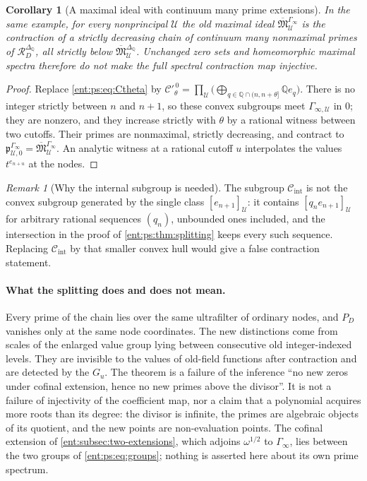 \documentclass[11pt]{article}
\theoremstyle{plain}
\theoremstyle{plain}
\theoremstyle{plain}
\newtheorem{corollary}[corollary]{Corollary}
\theoremstyle{definition}
\theoremstyle{definition}
\theoremstyle{definition}
\theoremstyle{definition}
\theoremstyle{remark}
\newtheorem{remark}[remark]{Remark}
\newcommand{\Q}{\mathbb Q}\newcommand{\Z}{\mathbb Z}\newcommand{\N}{\mathbb N}
\newcommand{\RD}{\mathcal R_D}\newcommand{\Ucal}{\mathcal U}
\begin{document}
\begin{corollary}[A maximal ideal with continuum many prime extensions]
\label{ent:ps:cor:maximal-splitting}
In the same example, for every nonprincipal $\Ucal$ the old maximal ideal
$\overline{\mathfrak M}{}^{\Gamma_\infty}_\Ucal$ is the contraction of a
strictly decreasing chain of continuum many nonmaximal primes of
$\RD^{\Delta_\Q}$, all strictly below
$\overline{\mathfrak M}{}^{\Delta_\Q}_\Ucal$. Unchanged zero sets and
homeomorphic maximal spectra therefore do not make the full spectral
contraction map injective.
\end{corollary}
\begin{proof}
Replace \eqref{ent:ps:eq:Ctheta} by
$\mathcal C'^{\,0}_\theta=\prod_\Ucal\bigl(\bigoplus_{q\in\Q\cap(n,n+\theta]}
\Q e_q\bigr)$. There is no integer strictly between $n$ and $n+1$, so these
convex subgroups meet $\Gamma_{\infty,\Ucal}$ in $0$; they are nonzero, and
they increase strictly with $\theta$ by a rational witness between two
cutoffs. Their primes are nonmaximal, strictly decreasing, and contract to
$\mathfrak p^{\Gamma_\infty}_{\Ucal,0}=\overline{\mathfrak
M}{}^{\Gamma_\infty}_\Ucal$. An analytic witness at a rational cutoff $u$
interpolates the values $t^{e_{n+u}}$ at the nodes.
\end{proof}

\begin{remark}[Why the internal subgroup is needed]
The subgroup $\mathcal C_{\mathrm{int}}$ is not the convex subgroup generated
by the single class $[e_{n+1}]_\Ucal$: it contains $[q_ne_{n+1}]_\Ucal$ for
arbitrary rational sequences $(q_n)$, unbounded ones included, and the
intersection in the proof of \cref{ent:ps:thm:splitting} keeps every such
sequence. Replacing $\mathcal C_{\mathrm{int}}$ by that smaller convex hull
would give a false contraction statement.
\end{remark}

\paragraph{What the splitting does and does not mean.}
Every prime of the chain lies over the same ultrafilter of ordinary nodes,
and $P_D$ vanishes only at the same node coordinates. The new distinctions
come from scales of the enlarged value group lying between consecutive old
integer-indexed levels. They are invisible to the values of old-field
functions after contraction and are detected by the $G_u$. The theorem is a
failure of the inference ``no new zeros under cofinal extension, hence no new
primes above the divisor''. It is not a failure of injectivity of the
coefficient map, nor a claim that a polynomial acquires more roots than its
degree: the divisor is infinite, the primes are algebraic objects of its
quotient, and the new points are non-evaluation points. The cofinal
extension of \cref{ent:subsec:two-extensions}, which adjoins $\omega^{1/2}$
to $\Gamma_\infty$, lies between the two groups of \eqref{ent:ps:eq:groups};
nothing is asserted here about its own prime spectrum.
\end{document}

